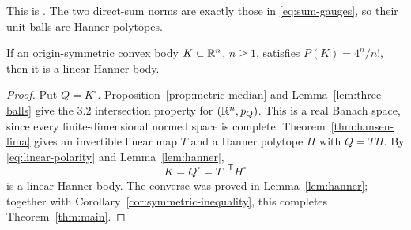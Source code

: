 This is \cite[Corollary~7.4]{HansenLima1981}. The two direct-sum norms
are exactly those in \eqref{eq:sum-gauges}, so their unit balls are
Hanner polytopes.

\begin{proposition}\label{prop:equality-classification}
If an origin-symmetric convex body $K\subset\mathbb R^n$, $n\ge1$, satisfies
$P(K)=4^n/n!$, then it is a linear Hanner body.
\end{proposition}

\begin{proof}
Put $Q=K^\circ$. Proposition~\ref{prop:metric-median} and
Lemma~\ref{lem:three-balls} give the 3.2 intersection property for
$(\mathbb R^n,p_Q)$. This is a real Banach space, since every finite-dimensional
normed space is complete. Theorem~\ref{thm:hansen-lima} gives an
invertible linear map $T$ and a Hanner polytope $H$ with $Q=TH$.
By \eqref{eq:linear-polarity} and Lemma~\ref{lem:hanner},
\[
 K=Q^\circ=T^{-\mathsf T}H^\circ
\]
is a linear Hanner body. The converse was proved in
Lemma~\ref{lem:hanner}; together with
Corollary~\ref{cor:symmetric-inequality}, this completes
Theorem~\ref{thm:main}.
\end{proof}
